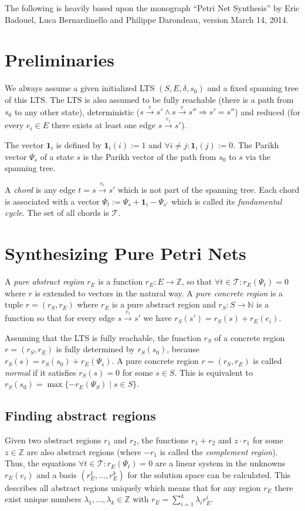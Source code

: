 \documentclass{scrartcl}
\newcommand{\N}{\mathbb{N}}
\newcommand{\Z}{\mathbb{Z}}
\newcommand{\T}{\mathcal{T}}
\newcommand{\1}{\textbf{1}}
\begin{document}
The following is heavily based upon the monograph ``Petri Net Synthesis'' by Eric Badouel, Luca Bernardinello and Philippe Darondeau, version March 14, 2014.

\section{Preliminaries}
We always assume a given initialized LTS \((S,E,\delta,s_0)\) and a fixed spanning tree of this LTS. The LTS is also
assumed to be fully reachable (there is a path from \(s_0\) to any other state), deterministic
(\(s\xrightarrow{e}s'\land s\xrightarrow{e}s''\Rightarrow s'=s''\)) and reduced (for every \(e_i\in E\) there exists
at least one edge \(s\xrightarrow{e_i}s'\)).

The vector \(\1_i\) is defined by \(\1_i(i):=1\) and \(\forall i\neq j\colon \1_i(j):=0\).
The Parikh vector \(\Psi_s\) of a state \(s\) is the Parikh vector of the path from \(s_0\) to \(s\)
via the spanning tree.

A \emph{chord} is any edge \(t=s\xrightarrow{e_i}s'\) which is not part of the spanning tree. Each chord is associated
with a vector \(\Psi_t:=\Psi_s+\1_i-\Psi_{s'}\) which is called its
\emph{fundamental cycle}. The set of all chords is \(\T\).

\section{Synthesizing Pure Petri Nets}
A \emph{pure abstract region} \(r_E\) is a function \(r_E\colon E\rightarrow\Z\), so that \(\forall t\in\T\colon
r_E(\Psi_t)=0\) where \(r\) is extended to vectors in the natural way.
A \emph{pure concrete region} is a tuple \(r=(r_S, r_E)\) where \(r_E\) is a pure abstract region and \(r_S\colon
S\rightarrow\N\) is a function so that for every edge \(s\xrightarrow{e_i}s'\) we have \(r_S(s')=r_S(s)+r_E(e_i)\).

Assuming that the LTS is fully reachable, the function \(r_S\) of a concrete region \(r=(r_S,r_E)\) is fully determined by \(r_S(s_0)\),
because \(r_S(s)=r_S(s_0)+r_E(\Psi_s)\).
A pure concrete region \(r=(r_S,r_E)\) is called \emph{normal} if it satisfies \(r_S(s)=0\) for some \(s\in S\).
This is equivalent to \(r_S(s_0)=\max\lbrace -r_E(\Psi_S) \mid s\in S\rbrace\).

\subsection{Finding abstract regions}
Given two abstract regions \(r_1\) and \(r_2\), the functions \(r_1+r_2\) and \(z\cdot r_1\) for some
\(z\in\Z\) are also abstract regions (where \(-r_1\) is called the \emph{complement region}).
Thus, the equations \(\forall t\in\T\colon r_E(\Psi_t)=0\) are a linear system in the unknowns \(r_E(e_i)\) and a basis
\((r_E^1,\dots, r_E^k)\) for the solution space can be calculated. This describes all abstract regions uniquely which means
that for any region \(r_E\) there exist unique numbers \(\lambda_1,\dots,\lambda_k\in\Z\) with \(r_E=\sum_{i=1}^k
\lambda_i r_E^i\).
\end{document}
